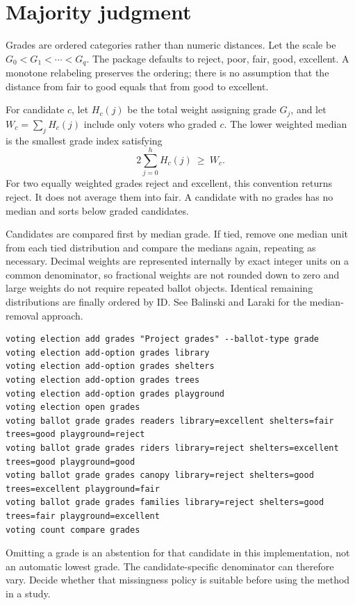 \section{Majority judgment}
Grades are ordered categories rather than numeric distances. Let the scale be $G_0<G_1<\cdots<G_q$. The package defaults to reject, poor, fair, good, excellent. A monotone relabeling preserves the ordering; there is no assumption that the distance from fair to good equals that from good to excellent.

For candidate $c$, let $H_c(j)$ be the total weight assigning grade $G_j$, and let $W_c=\sum_jH_c(j)$ include only voters who graded $c$. The lower weighted median is the smallest grade index satisfying
\[
2\sum_{j=0}^{h}H_c(j)\ \geq\ W_c.
\]
For two equally weighted grades reject and excellent, this convention returns reject. It does not average them into fair. A candidate with no grades has no median and sorts below graded candidates.

Candidates are compared first by median grade. If tied, remove one median unit from each tied distribution and compare the medians again, repeating as necessary. Decimal weights are represented internally by exact integer units on a common denominator, so fractional weights are not rounded down to zero and large weights do not require repeated ballot objects. Identical remaining distributions are finally ordered by ID. See Balinski and Laraki for the median-removal approach.\cite{majorityjudgment}
\begin{lstlisting}[style=votingrun]
voting election add grades "Project grades" --ballot-type grade
voting election add-option grades library
voting election add-option grades shelters
voting election add-option grades trees
voting election add-option grades playground
voting election open grades
voting ballot grade grades readers library=excellent shelters=fair trees=good playground=reject
voting ballot grade grades riders library=reject shelters=excellent trees=good playground=good
voting ballot grade grades canopy library=reject shelters=good trees=excellent playground=fair
voting ballot grade grades families library=reject shelters=good trees=fair playground=excellent
voting count compare grades
\end{lstlisting}
Omitting a grade is an abstention for that candidate in this implementation, not an automatic lowest grade. The candidate-specific denominator can therefore vary. Decide whether that missingness policy is suitable before using the method in a study.

